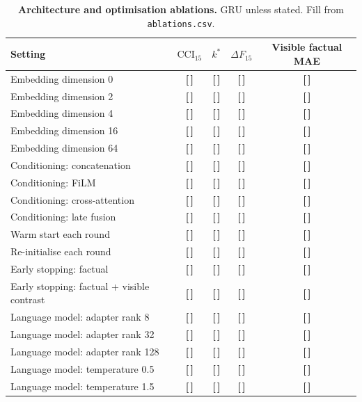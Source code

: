 \documentclass[11pt,a4paper]{article}
\newcommand{\T}{{\color{red}\textbf{[\,]}}}
\newcommand{\CCI}{\mathrm{CCI}}
\begin{document}
\begin{table}[!htbp]\centering\scriptsize
\caption{\textbf{Architecture and optimisation ablations.} GRU unless stated. Fill from \texttt{ablations.csv}.}
\begin{tabularx}{\textwidth}{@{}p{3.9cm} C C C C@{}}\toprule
Setting & $\CCI_{15}$ & $k^*$ & $\Delta F_{15}$ & Visible factual MAE\\\midrule
Embedding dimension 0 & \T & \T & \T & \T\\
Embedding dimension 2 & \T & \T & \T & \T\\
Embedding dimension 4 & \T & \T & \T & \T\\
Embedding dimension 16 & \T & \T & \T & \T\\
Embedding dimension 64 & \T & \T & \T & \T\\
\midrule
Conditioning: concatenation & \T & \T & \T & \T\\
Conditioning: FiLM & \T & \T & \T & \T\\
Conditioning: cross-attention & \T & \T & \T & \T\\
Conditioning: late fusion & \T & \T & \T & \T\\
\midrule
Warm start each round & \T & \T & \T & \T\\
Re-initialise each round & \T & \T & \T & \T\\
\midrule
Early stopping: factual & \T & \T & \T & \T\\
Early stopping: factual + visible contrast & \T & \T & \T & \T\\
\midrule
Language model: adapter rank 8 & \T & \T & \T & \T\\
Language model: adapter rank 32 & \T & \T & \T & \T\\
Language model: adapter rank 128 & \T & \T & \T & \T\\
Language model: temperature 0.5 & \T & \T & \T & \T\\
Language model: temperature 1.5 & \T & \T & \T & \T\\
\bottomrule\end{tabularx}
\end{table}
\FloatBarrier
\end{document}
